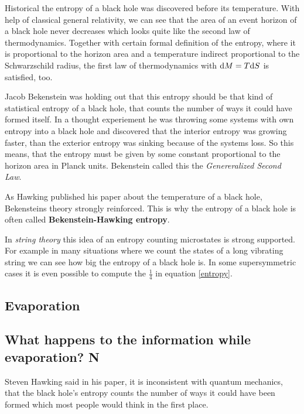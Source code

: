 	Historical the entropy of a black hole was discovered before its temperature. With help of classical general relativity, we can see that the area of an event horizon of a black hole never decreases which looks quite like the second law of thermodynamics. Together with certain formal definition of the entropy, where it is proportional to the horizon area and a temperature indirect proportional to the Schwarzschild radius, the first law of thermodynamics with $\mathrm{d} M = T \mathrm{d} S$ is satisfied, too. 
	
	Jacob Bekenstein was holding out that this entropy should be that kind of statistical entropy of a black hole, that counts the number of ways it could have formed itself. 
	In a thought experiement he was throwing some systems with own entropy into a black hole and discovered that the interior entropy was growing faster, than the exterior entropy was sinking because of the systems loss. 
	So this means, that the entropy must be given by some constant proportional to the horizon area in Planck units.
	Bekenstein called this the \textit{Genereralized Second Law}.
	
	As Hawking published his paper about the temperature of a black hole, Bekensteins theory strongly reinforced. This is why the entropy of a black hole is often called \textbf{Bekenstein-Hawking entropy}. 
	
	In \textit{string theory} this idea of an entropy counting microstates is strong supported. For example in many situations where we count the states of a long vibrating string we can see how big the entropy of a black hole is. In some supersymmetric cases it is even possible to compute the $\frac{1}{4}$ in equation \eqref{entropy}.
	
	\subsection{Evaporation}

	\subsection{What happens to the information while evaporation? N}
	Steven Hawking said in his paper\marginpar{[2]}, it is inconsistent with quantum mechanics, that the black hole's entropy counts the number of ways it could have been formed which most people would think in the first place. 
	
